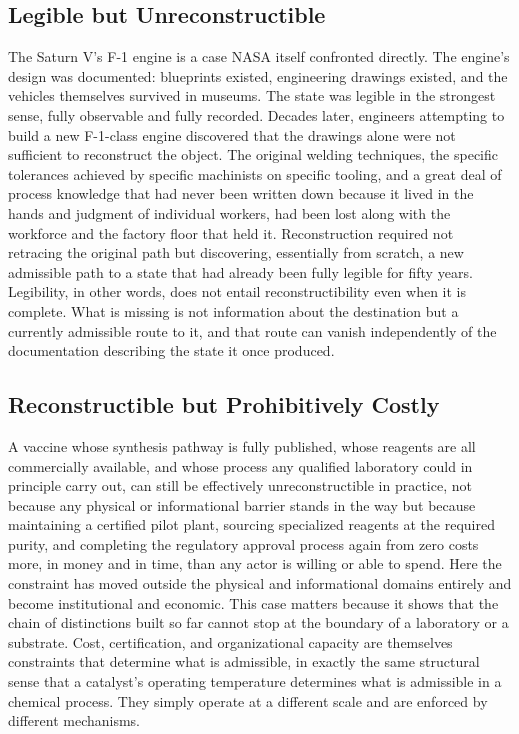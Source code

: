 \documentclass[11pt]{book}
\begin{document}
\subsection{Legible but Unreconstructible}

The Saturn V's F-1 engine is a case NASA itself confronted directly. The engine's design was documented: blueprints existed, engineering drawings existed, and the vehicles themselves survived in museums. The state was legible in the strongest sense, fully observable and fully recorded. Decades later, engineers attempting to build a new F-1-class engine discovered that the drawings alone were not sufficient to reconstruct the object. The original welding techniques, the specific tolerances achieved by specific machinists on specific tooling, and a great deal of process knowledge that had never been written down because it lived in the hands and judgment of individual workers, had been lost along with the workforce and the factory floor that held it. Reconstruction required not retracing the original path but discovering, essentially from scratch, a new admissible path to a state that had already been fully legible for fifty years. Legibility, in other words, does not entail reconstructibility even when it is complete. What is missing is not information about the destination but a currently admissible route to it, and that route can vanish independently of the documentation describing the state it once produced.

\subsection{Reconstructible but Prohibitively Costly}

A vaccine whose synthesis pathway is fully published, whose reagents are all commercially available, and whose process any qualified laboratory could in principle carry out, can still be effectively unreconstructible in practice, not because any physical or informational barrier stands in the way but because maintaining a certified pilot plant, sourcing specialized reagents at the required purity, and completing the regulatory approval process again from zero costs more, in money and in time, than any actor is willing or able to spend. Here the constraint has moved outside the physical and informational domains entirely and become institutional and economic. This case matters because it shows that the chain of distinctions built so far cannot stop at the boundary of a laboratory or a substrate. Cost, certification, and organizational capacity are themselves constraints that determine what is admissible, in exactly the same structural sense that a catalyst's operating temperature determines what is admissible in a chemical process. They simply operate at a different scale and are enforced by different mechanisms.
\end{document}

